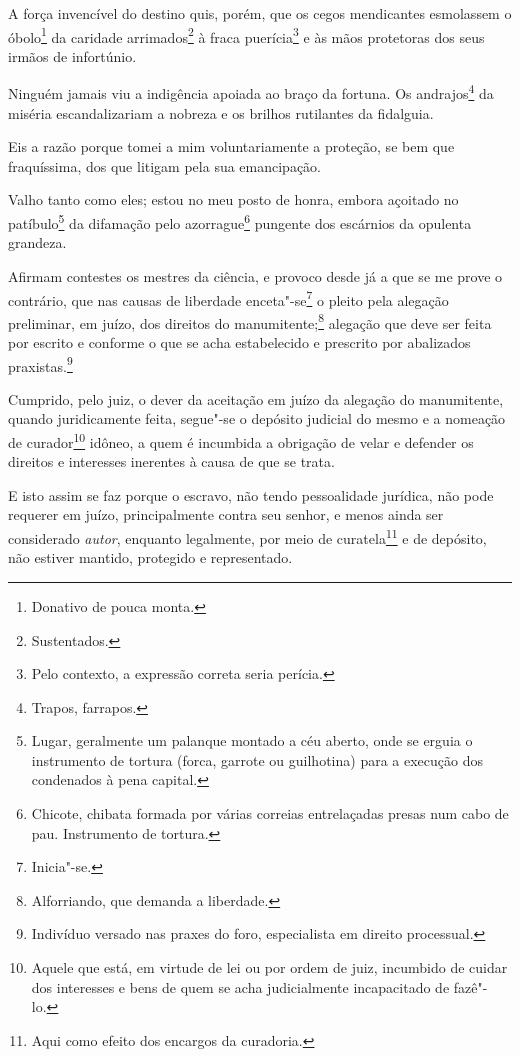 A força invencível do destino quis, porém, que os cegos mendicantes
esmolassem o óbolo\footnote{Donativo de pouca monta.} da caridade
arrimados\footnote{Sustentados.} à fraca puerícia\footnote{Pelo
  contexto, a expressão correta seria perícia.} e às mãos protetoras dos
seus irmãos de infortúnio.

Ninguém jamais viu a indigência apoiada ao braço da fortuna. Os
andrajos\footnote{Trapos, farrapos.} da miséria escandalizariam a
nobreza e os brilhos rutilantes da fidalguia.

Eis a razão porque tomei a mim voluntariamente a proteção, se bem que
fraquíssima, dos que litigam pela sua emancipação.

Valho tanto como eles; estou no meu posto de honra, embora açoitado no
patíbulo\footnote{Lugar, geralmente um palanque montado a céu aberto,
  onde se erguia o instrumento de tortura (forca, garrote ou guilhotina)
  para a execução dos condenados à pena capital.} da difamação pelo
azorrague\footnote{Chicote, chibata formada por várias correias
  entrelaçadas presas num cabo de pau. Instrumento de tortura.} pungente
dos escárnios da opulenta grandeza.

\asterisc

Afirmam contestes os mestres da ciência, e provoco desde já a que se me
prove o contrário, que nas causas de liberdade enceta"-se\footnote{
  Inicia"-se.} o pleito pela alegação preliminar, em juízo, dos direitos
do manumitente;\footnote{Alforriando, que demanda a liberdade.}
alegação que deve ser feita por escrito e conforme o que se acha
estabelecido e prescrito por abalizados praxistas.\footnote{Indivíduo
  versado nas praxes do foro, especialista em direito processual.}

Cumprido, pelo juiz, o dever da aceitação em juízo da alegação do
manumitente, quando juridicamente feita, segue"-se o depósito judicial do
mesmo e a nomeação de curador\footnote{Aquele que está, em virtude de
  lei ou por ordem de juiz, incumbido de cuidar dos interesses e bens de
  quem se acha judicialmente incapacitado de fazê"-lo.} idôneo, a quem é
incumbida a obrigação de velar e defender os direitos e interesses
inerentes à causa de que se trata.

E isto assim se faz porque o escravo, não tendo pessoalidade jurídica,
não pode requerer em juízo, principalmente contra seu senhor, e menos
ainda ser considerado \emph{autor}, enquanto legalmente, por meio de
curatela\footnote{Aqui como efeito dos encargos da curadoria.} e de
depósito, não estiver mantido, protegido e representado.

